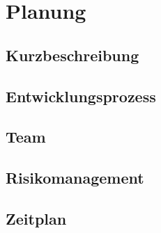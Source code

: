 
\newpage

\chapter{Planung} %
\label{cha:planung}

\section{Kurzbeschreibung}
\label{sec:kurzbeschreibung}



\section{Entwicklungsprozess}
\label{sec:entwicklungsprozess}



\section{Team}
\label{sec:team}



\section{Risikomanagement}
\label{sec:risikomanagement}


\section{Zeitplan}
\label{sec:zeitplan}

